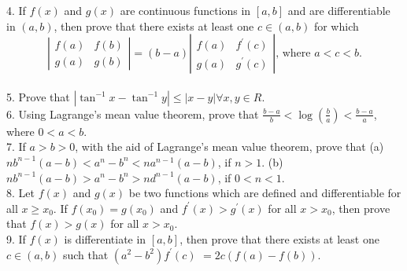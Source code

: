 4. If $f(x)$ and $g(x)$ are continuous functions in $[a, b]$ and are differentiable in $(a, b)$, then prove that there exists at least one $c \in(a, b)$ for which
$$
\left|\begin{array}{ll}
f(a) & f(b) \\
g(a) & g(b)
\end{array}\right|=(b-a)\left|\begin{array}{ll}
f(a) & f^{\prime}(c) \\
g(a) & g^{\prime}(c)
\end{array}\right| \text {, where } a<c<b .
$$\\
5. Prove that $\left|\tan ^{-1} x-\tan ^{-1} y\right| \leq|x-y| \forall x, y \in R$.\\
6. Using Lagrange's mean value theorem, prove that $\frac{b-a}{b}<\log \left(\frac{b}{a}\right)<\frac{b-a}{a}$, where $0<a<b$.\\
7. If $a>b>0$, with the aid of Lagrange's mean value theorem, prove that
(a) $n b^{n-1}(a-b)<a^n-b^n<n a^{n-1}(a-b)$, if $n>1$.
(b) $n b^{n-1}(a-b)>a^n-b^n>n d^{n-1}(a-b)$, if $0<n<1$.\\
8. Let $f(x)$ and $g(x)$ be two functions which are defined and differentiable for all $x \geq x_0$. If $f\left(x_0\right)=g\left(x_0\right)$ and $f^{\prime}(x)>g^{\prime}(x)$ for all $x>x_0$, then prove that $f(x)>g(x)$ for all $x>x_0$.\\
9. If $f(x)$ is differentiate in $[a, b]$, then prove that there exists at least one $c \in(a, b)$ such that $\left(a^2-b^2\right) f^{\prime}(c)$ $=2 c(f(a)-f(b))$.\\

